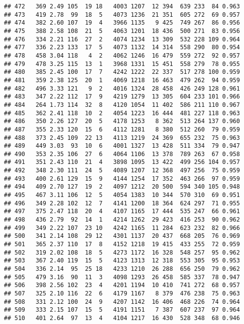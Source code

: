 \documentclass[]{article}
\begin{document}
\begin{verbatim}
## 472   369 2.49 105  19 18   4003 1207  12 394  639 233  84 0.963
## 473   419 2.78  99  18  5   4073 1236  21 351  605 272  69 0.957
## 474   382 2.60 107  19  4   3966 1135   9 425  749 267  86 0.956
## 475   388 2.58 108  21  5   4063 1201  18 436  500 271  83 0.956
## 476   334 2.21 116  27  2   4074 1234  13 309  532 228 109 0.964
## 477   336 2.23 133  17  5   4073 1132  14 314  558 290  80 0.954
## 478   458 3.04 118   4  2   4062 1246  16 479  559 272  92 0.957
## 479   478 3.25 115  13  1   3968 1331  15 451  558 279  78 0.955
## 480   385 2.45 100  17  7   4242 1222  22 337  517 278 100 0.959
## 481   359 2.38 125  20  1   4069 1218  16 463  479 262  94 0.959
## 482   496 3.33 121   9  2   4016 1324  28 458  426 249 128 0.961
## 483   347 2.22 112  17  9   4219 1279  13 305  604 233 101 0.966
## 484   264 1.73 114  32  8   4120 1054  11 402  586 211 110 0.967
## 485   362 2.41 118  10  2   4054 1223  16 444  481 227 118 0.963
## 486   350 2.26 127  20  5   4178 1253   8 362  513 264 137 0.960
## 487   355 2.33 120  15  6   4112 1281   8 380  512 260  79 0.959
## 488   373 2.45 109  22 13   4113 1219  24 369  655 232  75 0.963
## 489   449 3.03  93  10  6   4001 1327  13 428  511 334  79 0.947
## 490   353 2.35 106  27  6   4064 1106  13 378  789 263  67 0.958
## 491   351 2.43 110  21  4   3898 1095  13 422  499 256 104 0.957
## 492   348 2.30 111  24  5   4089 1207  12 368  497 256  75 0.959
## 493   400 2.61 129  15  9   4144 1254  17 352  463 266  97 0.959
## 494   409 2.70 127  19  2   4097 1212  20 500  594 340 105 0.948
## 495   467 3.11 106  12  5   4054 1383  10 344  570 310  69 0.951
## 496   349 2.28 102  12  7   4141 1200  18 364  624 297  71 0.955
## 497   375 2.47 118  20  4   4107 1165  17 444  535 247  66 0.961
## 498   436 2.79  92  14  1   4214 1262  29 423  416 253  90 0.962
## 499   349 2.22 107  23 10   4242 1165  11 284  623 232  82 0.966
## 500   341 2.14 108  29 12   4301 1137  20 437  668 205  76 0.969
## 501   365 2.37 110  17  8   4152 1218  19 415  433 255  72 0.959
## 502   319 2.02 108  18  5   4273 1172  16 328  548 257  95 0.962
## 503   367 2.40 119  15  5   4123 1313  12 318  553 305  95 0.953
## 504   336 2.14  95  25 18   4233 1210  26 288  656 250  79 0.962
## 505   479 3.16  90  11  3   4098 1293  26 458  585 337  78 0.947
## 506   398 2.56 102  23  4   4201 1194  10 410  741 272  68 0.957
## 507   325 2.10 116  22  6   4179 1167   8 379  476 238  75 0.963
## 508   331 2.12 100  24  9   4207 1142  16 406  468 226  74 0.964
## 509   333 2.15 107  15  5   4191 1151   7 387  607 237  97 0.964
## 510   401 2.64  97  13  4   4104 1217  16 430  528 348  68 0.946

\end{verbatim}
\end{document}
